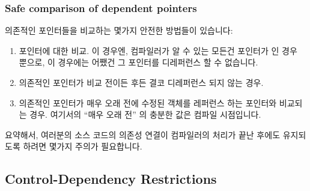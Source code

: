 
\subsubsection{Safe comparison of dependent pointers}
의존적인 포인터들을 비교하는 몇가지 안전한 방법들이 있습니다:

\begin{enumerate}
\item	{} 포인터에 대한 비교.
	이 경우엔, 컴파일러가 알 수 있는 모든건 포인터가  인 경우
	뿐으로, 이 경우에는 어쨌건 그 포인터를 디레퍼런스 할 수 없습니다.
\item	의존적인 포인터가 비교 전이든 후든 결코 디레퍼런스 되지 않는 경우.
\item	의존적인 포인터가 매우 오래 전에 수정된 객체를 레퍼런스 하는 포인터와
	비교되는 경우.  여기서의 ``매우 오래 전'' 의 충분한 값은 컴파일
	시점입니다.

\end{enumerate}



요약해서, 여러분의 소스 코드의 의존성 연결이 컴파일러의 처리가 끝난 후에도
유지되도록 하려면 몇가지 주의가 필요합니다.

\subsection{Control-Dependency Restrictions}
\label{sec:memorder:Control-Dependency Restrictions}

